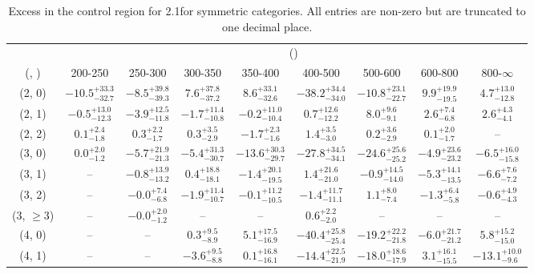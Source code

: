 \begin{table}[h!]
\tiny
\centering
\caption{Excess in the \mj control region for 2.1\ifb for symmetric categories. All entries are non-zero but are truncated to one decimal place.\label{tab:excesssepnaive_mu_ewk_sym}}
\begin{tabular}
{ccccccccc}
	\hline\hline
	& \multicolumn{8}{c}{\scalht (\gev)} \\ 
	 (\njet,  \nb) & 200-250 & 250-300 & 300-350 & 350-400 & 400-500 & 500-600 & 600-800 & 800-$\infty$ \\ [0.8ex] 
\hline
	(2, 0) & $-10.5^{+ 33.3 }_{- 32.7 }$ & $-8.5^{+ 39.8 }_{- 39.3 }$ & $7.6^{+ 37.8 }_{- 37.2 }$ & $8.6^{+ 33.1 }_{- 32.6 }$ & $-38.2^{+ 34.4 }_{- 34.0 }$ & $-10.8^{+ 23.1 }_{- 22.7 }$ & $9.9^{+ 19.9 }_{- 19.5 }$ & $4.7^{+ 13.0 }_{- 12.8 }$ \\[0.5ex] 
	(2, 1) & $-0.5^{+ 13.0 }_{- 12.3 }$ & $-3.9^{+ 12.5 }_{- 11.8 }$ & $-1.7^{+ 11.4 }_{- 10.8 }$ & $-0.2^{+ 11.0 }_{- 10.4 }$ & $0.7^{+ 12.6 }_{- 12.2 }$ & $8.0^{+ 9.6 }_{- 9.1 }$ & $2.6^{+ 7.4 }_{- 6.8 }$ & $2.6^{+ 4.3 }_{- 4.1 }$ \\[0.5ex] 
	(2, 2) & $0.1^{+ 2.4 }_{- 1.8 }$ & $0.3^{+ 2.2 }_{- 1.7 }$ & $0.3^{+ 3.5 }_{- 2.9 }$ & $-1.7^{+ 2.3 }_{- 1.6 }$ & $1.4^{+ 3.5 }_{- 3.0 }$ & $0.2^{+ 3.6 }_{- 2.9 }$ & $0.1^{+ 2.0 }_{- 1.7 }$ & -- \\[0.5ex] 
	(3, 0) & $0.0^{+ 2.0 }_{- 1.2 }$ & $-5.7^{+ 21.9 }_{- 21.3 }$ & $-5.4^{+ 31.3 }_{- 30.7 }$ & $-13.6^{+ 30.3 }_{- 29.7 }$ & $-27.8^{+ 34.5 }_{- 34.1 }$ & $-24.6^{+ 25.6 }_{- 25.2 }$ & $-4.9^{+ 23.6 }_{- 23.2 }$ & $-6.5^{+ 16.0 }_{- 15.8 }$ \\[0.5ex] 
	(3, 1) & -- & $-0.8^{+ 13.9 }_{- 13.2 }$ & $0.4^{+ 18.8 }_{- 18.1 }$ & $-1.4^{+ 20.1 }_{- 19.5 }$ & $1.4^{+ 21.6 }_{- 21.0 }$ & $-0.9^{+ 14.5 }_{- 14.0 }$ & $-5.3^{+ 14.1 }_{- 13.5 }$ & $-6.6^{+ 7.6 }_{- 7.2 }$ \\[0.5ex] 
	(3, 2) & -- & $-0.0^{+ 7.4 }_{- 6.8 }$ & $-1.9^{+ 11.4 }_{- 10.7 }$ & $-0.1^{+ 11.2 }_{- 10.5 }$ & $-1.4^{+ 11.7 }_{- 11.1 }$ & $1.1^{+ 8.0 }_{- 7.4 }$ & $-1.3^{+ 6.4 }_{- 5.8 }$ & $-0.6^{+ 4.9 }_{- 4.3 }$ \\[0.5ex] 
	(3, $\ge3$) & -- & $-0.0^{+ 2.0 }_{- 1.2 }$ & -- & -- & $0.6^{+ 2.2 }_{- 2.0 }$ & -- & -- & -- \\[0.5ex] 
	(4, 0) & -- & -- & $0.3^{+ 9.5 }_{- 8.9 }$ & $5.1^{+ 17.5 }_{- 16.9 }$ & $-40.4^{+ 25.8 }_{- 25.4 }$ & $-19.2^{+ 22.2 }_{- 21.8 }$ & $-6.0^{+ 21.7 }_{- 21.2 }$ & $5.8^{+ 15.2 }_{- 15.0 }$ \\[0.5ex] 
	(4, 1) & -- & -- & $-3.6^{+ 9.5 }_{- 8.8 }$ & $0.1^{+ 16.8 }_{- 16.1 }$ & $-14.4^{+ 22.5 }_{- 21.9 }$ & $-18.0^{+ 18.6 }_{- 17.9 }$ & $3.1^{+ 16.1 }_{- 15.5 }$ & $-13.1^{+ 10.0 }_{- 9.6 }$ \\[0.5ex] 

\end{tabular}
\end{table}
